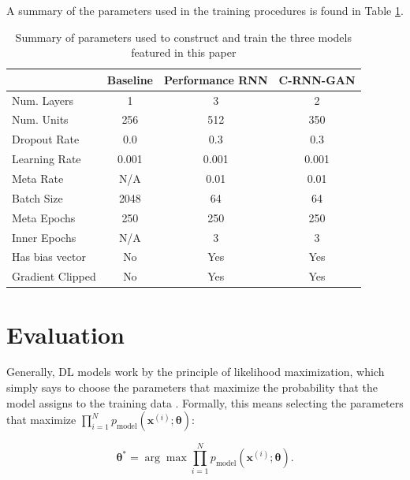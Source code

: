 \documentclass[a4paper]{book}
\begin{document}
A summary of the parameters used in the training procedures is found in Table \ref{tab:params}.

\begin{table}[ht]
    \centering
    \begin{tabular}{l|c|c|c}
                    &\bf Baseline   &\bf Performance RNN&\bf C-RNN-GAN  \\ \hline
    Num. Layers     &   1           &   3               &   2           \\
    Num. Units      &   256         &   512             &   350         \\
    Dropout Rate    &   0.0         &   0.3             &   0.3         \\
    Learning Rate   &   0.001       &   0.001           &   0.001       \\
    Meta Rate       &   N/A         &   0.01            &   0.01        \\
    Batch Size      &   2048        &   64              &   64          \\
    Meta Epochs     &   250         &   250             &   250         \\
    Inner Epochs    &   N/A         &   3               &   3           \\
    Has bias vector &   No          &   Yes             &   Yes         \\
    Gradient Clipped&   No          &   Yes             &   Yes         \\
    \end{tabular}
    \caption{Summary of parameters used to construct and train the three models featured in this paper}
    \label{tab:params}
\end{table}

\section{Evaluation} \label{sec:evaluation}

Generally, DL models work by the principle of likelihood maximization, which simply says to choose the parameters that maximize the probability that the model assigns to the training data \parencite{goodfellow_nips_2016}. Formally, this means selecting the parameters that maximize $\prod_{i=1}^N p_{\text{model}}(\bm{x}^{(i)}; \bm{\theta})$:

\begin{equation}
    \bm{\theta^*} = \arg \max \prod_{i=1}^N p_{\text{model}}(\bm{x}^{(i)}; \bm{\theta}) \label{eq:og_mle}.
\end{equation}
\end{document}
